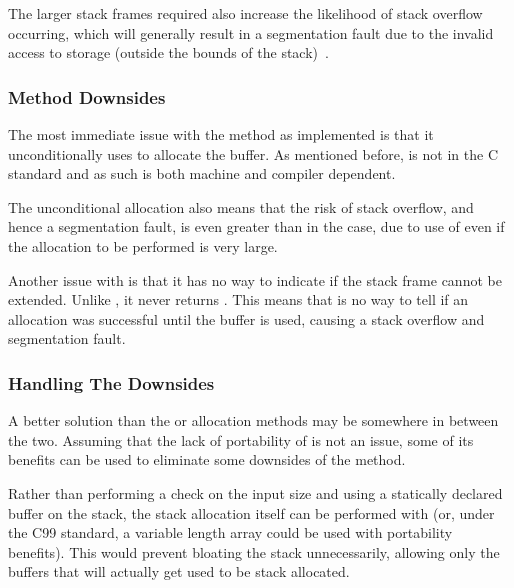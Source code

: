 The larger stack frames required also increase the likelihood of stack overflow occurring, which will generally result in a segmentation fault due to the invalid access to storage (outside the bounds of the stack)~\cite{c11std}.

\subsubsection{ Method Downsides}

The most immediate issue with the  method as implemented is that it unconditionally uses  to allocate the buffer. As mentioned before,  is not in the C standard and as such is both machine and compiler dependent.

The unconditional allocation also means that the risk of stack overflow, and hence a segmentation fault, is even greater than in the  case, due to use of  even if the allocation to be performed is very large.

Another issue with  is that it has no way to indicate if the stack frame cannot be extended. Unlike \malloc{}, it never returns . This means that is no way to tell if an allocation was successful until the buffer is used, causing a stack overflow and segmentation fault.

\subsubsection{Handling The Downsides}

A better solution than the  or  allocation methods may be somewhere in between the two. Assuming that the lack of portability of  is not an issue, some of its benefits can be used to eliminate some downsides of the  method.

Rather than performing a check on the input size and using a statically declared buffer on the stack, the stack allocation itself can be performed with  (or, under the C99 standard, a variable length array could be used with portability benefits). This would prevent bloating the stack unnecessarily, allowing only the buffers that will actually get used to be stack allocated.

